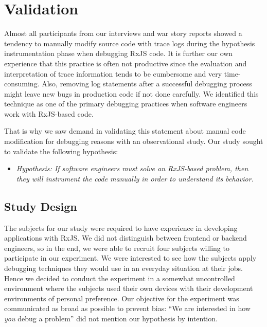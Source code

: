 \documentclass[sigplan,screen,review]{acmart}
\begin{document}
\section{Validation}
\label{sec:study}

Almost all participants from our interviews and war story reports showed a tendency to manually modify source code with trace logs during the hypothesis instrumentation phase when debugging RxJS code. It is further our own experience that this practice is often not productive since the evaluation and interpretation of trace information tends to be cumbersome and very time-consuming. Also, removing log statements after a successful debugging process might leave new bugs in production code if not done carefully. We identified this technique as one of the primary debugging practices when software engineers work with RxJS-based code.

That is why we saw demand in validating this statement about manual code modification for debugging reasons with an observational study. Our study sought to validate the following hypothesis:

\begin{itemize}
	\item \emph{Hypothesis: If software engineers must solve an RxJS-based problem, then they will instrument the code manually in order to understand its behavior.}
\end{itemize}

\subsection{Study Design}

The subjects for our study were required to have experience in developing applications with RxJS. We did not distinguish between frontend or backend engineers, so in the end, we were able to recruit four subjects willing to participate in our experiment. We were interested to see how the subjects apply debugging techniques they would use in an everyday situation at their jobs. Hence we decided to conduct the experiment in a somewhat uncontrolled environment where the subjects used their own devices with their development environments of personal preference. Our objective for the experiment was communicated as broad as possible to prevent bias: ``We are interested in how \emph{you} debug a problem'' did not mention our hypothesis by intention.
\end{document}
